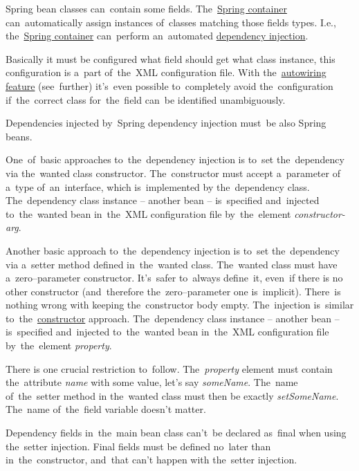 \label{springdependencyinjection}
Spring bean classes can~contain some fields.
The~\hyperref[springcontainrer]{Spring container} can~automatically assign instances of~classes matching those fields types.
I.e., the~\hyperref[springcontainrer]{Spring container} can~perform an~automated \hyperref[dependencyinjection]{dependency injection}.

Basically it must be configured what field should get what class instance, this configuration is a~part of~the~XML configuration file.
With the~\hyperref[autowiring]{autowiring feature} (see~further) it's~even possible to~completely avoid the~configuration if~the~correct class for~the~field can~be identified unambiguously.

\note Dependencies injected by~Spring dependency injection must~be also Spring beans.

\label{constructorinjection}
One~of~basic approaches to~the~dependency injection is to~set the~dependency via the~wanted class constructor.
The~constructor must accept a~parameter of a~type of~an~interface, which is~implemented by the~dependency class.
The~dependency class instance -- another bean --  is~specified and~injected to~the~wanted bean in~the~XML configuration file by~the~element \textit{constructor-arg}.

\label{setterinjection}
Another basic approach to~the~dependency injection is to~set the~dependency via a~setter method defined in~the~wanted class.
The~wanted class must have a~zero--parameter constructor.
It's~safer to~always define~it, even~if there is no other constructor (and~therefore the~zero--parameter one is~implicit).
There~is nothing wrong with keeping the~constructor body empty.
The~injection is~similar to~the~\hyperref[constructorinjection]{constructor} approach.
The~dependency class instance -- another bean --  is~specified and~injected to~the~wanted bean in~the~XML configuration file by~the~element \textit{property}.

\warning There is one crucial restriction to~follow.
The~\textit{property} element must contain the~attribute \textit{name} with some value, let's say \textit{someName}.
The~name of~the~setter method in the~wanted class must then be exactly \textit{setSomeName}.
The~name of~the~field variable doesn't matter.

\warning Dependency fields in~the~main bean class can't~be declared as~final when using the~setter injection.
Final fields must be defined no~later than in~the~constructor, and~that can't happen with the~setter injection.

